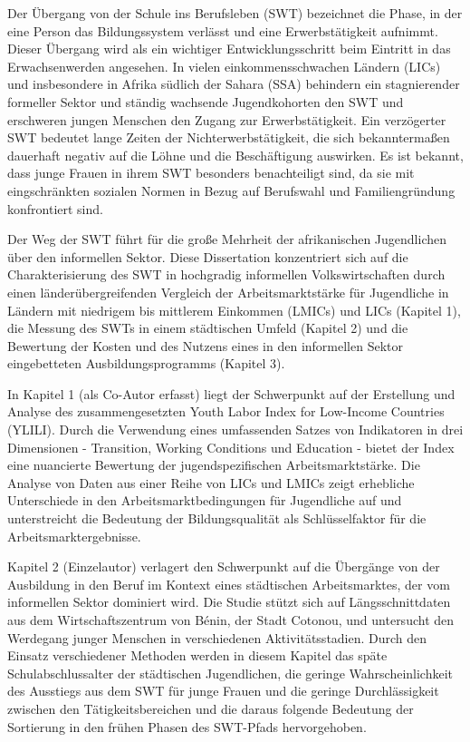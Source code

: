 Der Übergang von der Schule ins Berufsleben (SWT) bezeichnet die Phase, in der eine Person das Bildungssystem verlässt und eine Erwerbstätigkeit aufnimmt. Dieser Übergang wird als ein wichtiger Entwicklungsschritt beim Eintritt in das Erwachsenwerden angesehen. In vielen einkommensschwachen Ländern (LICs) und insbesondere in Afrika südlich der Sahara (SSA) behindern ein stagnierender formeller Sektor und ständig wachsende Jugendkohorten den SWT und erschweren jungen Menschen den Zugang zur Erwerbstätigkeit. Ein verzögerter SWT bedeutet lange Zeiten der Nichterwerbstätigkeit, die sich bekanntermaßen dauerhaft negativ auf die Löhne und die Beschäftigung auswirken. Es ist bekannt, dass junge Frauen in ihrem SWT besonders benachteiligt sind, da sie mit eingschränkten sozialen Normen in Bezug auf Berufswahl und Familiengründung konfrontiert sind.

Der Weg der SWT führt für die große Mehrheit der afrikanischen Jugendlichen über den informellen Sektor. Diese Dissertation konzentriert sich auf die Charakterisierung des SWT in hochgradig informellen Volkswirtschaften durch einen länderübergreifenden Vergleich der Arbeitsmarktstärke für Jugendliche in Ländern mit niedrigem bis mittlerem Einkommen (LMICs) und LICs (Kapitel 1), die Messung des SWTs in einem städtischen Umfeld (Kapitel 2) und die Bewertung der Kosten und des Nutzens eines in den informellen Sektor eingebetteten Ausbildungsprogramms (Kapitel 3).

In Kapitel 1 (als Co-Autor erfasst) liegt der Schwerpunkt auf der Erstellung und Analyse des zusammengesetzten Youth Labor Index for Low-Income Countries (YLILI). Durch die Verwendung eines umfassenden Satzes von Indikatoren in drei Dimensionen - Transition, Working Conditions und Education - bietet der Index eine nuancierte Bewertung der jugendspezifischen Arbeitsmarktstärke. Die Analyse von Daten aus einer Reihe von LICs und LMICs zeigt erhebliche Unterschiede in den Arbeitsmarktbedingungen für Jugendliche auf und unterstreicht die Bedeutung der Bildungsqualität als Schlüsselfaktor für die Arbeitsmarktergebnisse.

Kapitel 2 (Einzelautor) verlagert den Schwerpunkt auf die Übergänge von der Ausbildung in den Beruf im Kontext eines städtischen Arbeitsmarktes, der vom informellen Sektor dominiert wird. Die Studie stützt sich auf Längsschnittdaten aus dem Wirtschaftszentrum von Bénin, der Stadt Cotonou, und untersucht den Werdegang junger Menschen in verschiedenen Aktivitätsstadien. Durch den Einsatz verschiedener Methoden werden in diesem Kapitel das späte Schulabschlussalter der städtischen Jugendlichen, die geringe Wahrscheinlichkeit des Ausstiegs aus dem SWT für junge Frauen und die geringe Durchlässigkeit zwischen den Tätigkeitsbereichen und die daraus folgende Bedeutung der Sortierung in den frühen Phasen des SWT-Pfads hervorgehoben.

